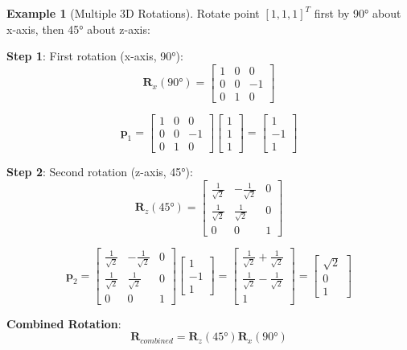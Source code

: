\documentclass[12pt,a4paper]{article}
\theoremstyle{definition}
\newtheorem{example}{Example}[section]
\begin{document}
\begin{example}[Multiple 3D Rotations]
Rotate point $[1, 1, 1]^T$ first by 90° about x-axis, then 45° about z-axis:

\textbf{Step 1}: First rotation (x-axis, 90°):
\[
\mathbf{R}_x(90°) = \begin{bmatrix}
1 & 0 & 0 \\
0 & 0 & -1 \\
0 & 1 & 0
\end{bmatrix}
\]

\[
\mathbf{p}_1 = \begin{bmatrix}
1 & 0 & 0 \\
0 & 0 & -1 \\
0 & 1 & 0
\end{bmatrix}
\begin{bmatrix}
1 \\ 1 \\ 1
\end{bmatrix}
= \begin{bmatrix}
1 \\ -1 \\ 1
\end{bmatrix}
\]

\textbf{Step 2}: Second rotation (z-axis, 45°):
\[
\mathbf{R}_z(45°) = \begin{bmatrix}
\frac{1}{\sqrt{2}} & -\frac{1}{\sqrt{2}} & 0 \\
\frac{1}{\sqrt{2}} & \frac{1}{\sqrt{2}} & 0 \\
0 & 0 & 1
\end{bmatrix}
\]

\[
\mathbf{p}_2 = \begin{bmatrix}
\frac{1}{\sqrt{2}} & -\frac{1}{\sqrt{2}} & 0 \\
\frac{1}{\sqrt{2}} & \frac{1}{\sqrt{2}} & 0 \\
0 & 0 & 1
\end{bmatrix}
\begin{bmatrix}
1 \\ -1 \\ 1
\end{bmatrix}
= \begin{bmatrix}
\frac{1}{\sqrt{2}} + \frac{1}{\sqrt{2}} \\
\frac{1}{\sqrt{2}} - \frac{1}{\sqrt{2}} \\
1
\end{bmatrix}
= \begin{bmatrix}
\sqrt{2} \\ 0 \\ 1
\end{bmatrix}
\]

\textbf{Combined Rotation}:
\[
\mathbf{R}_{combined} = \mathbf{R}_z(45°)\mathbf{R}_x(90°)
\]
\end{example}
\end{document}
